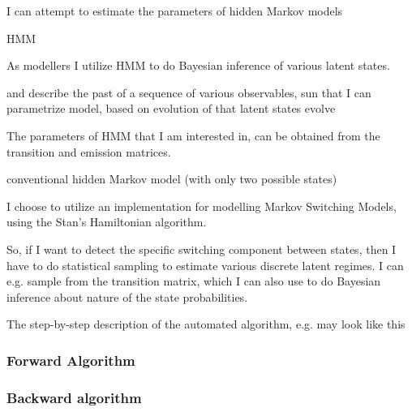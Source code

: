 \documentclass[a4paper,11pt,english]{article}
\begin{document}
		I can attempt to estimate the parameters of hidden Markov models
		
		HMM 
		
		As modellers I utilize HMM to do Bayesian inference of various latent states. 
		
		and describe the past of a sequence of various observables, sun that I can parametrize 	
		model, based on evolution of  that latent states evolve
		
		The parameters of HMM that I am interested in, can be obtained from the transition and emission matrices.  
		
			

		conventional hidden Markov model (with only two possible states)	
		
		I choose to utilize an implementation for modelling Markov Switching Models, using the Stan's Hamiltonian algorithm.

		So, if I want to detect the specific switching component between states, then I have to do statistical sampling to estimate various discrete 
		latent regimes. I can e.g. sample from the transition matrix, which I can also use to do Bayesian inference about nature of the state 
		probabilities.
	
		The step-by-step description of the automated algorithm, e.g. may look like this
		
			\subsubsection{Forward Algorithm}

			\subsubsection{Backward algorithm}
		
\end{document}
